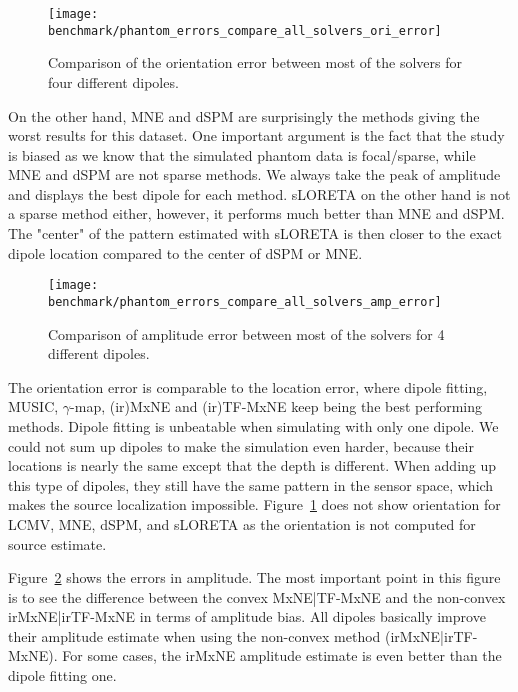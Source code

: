 \begin{figure}[h!]
	\centering 
    \texttt{[image: benchmark/phantom\_errors\_compare\_all\_solvers\_ori\_error]}
    \caption{Comparison of the orientation error between most of the solvers for four different dipoles. \label{fig:all_solvers_ori_error}}
\end{figure}

On the other hand, MNE and dSPM are surprisingly the methods giving the worst results for this dataset. One important argument is the fact that the study is biased as we know that the simulated phantom data is focal/sparse, while MNE and dSPM are not sparse methods. We always take the peak of amplitude and displays the best dipole for each method. sLORETA on the other hand is not a sparse method either, however, it performs much better than MNE and dSPM. The "center" of the pattern estimated with sLORETA is then closer to the exact dipole location compared to the center of dSPM or MNE.

\begin{figure}[h!]
	\texttt{[image: benchmark/phantom\_errors\_compare\_all\_solvers\_amp\_error]}
	\caption{Comparison of amplitude error between most of the solvers for 4 different dipoles.\label{fig:all_solvers_amp_error}}
\end{figure}

The orientation error is comparable to the location error, where dipole fitting, MUSIC, $\gamma$-map, (ir)MxNE and (ir)TF-MxNE keep being the best performing methods. Dipole fitting is unbeatable when simulating with only one dipole. We could not sum up dipoles to make the simulation even harder, because their locations is nearly the same except that the depth is different. When adding up this type of dipoles, they still have the same pattern in the sensor space, which makes the source localization impossible. Figure~\ref{fig:all_solvers_ori_error} does not show orientation for LCMV, MNE, dSPM, and sLORETA as the orientation is not computed for source estimate.

Figure~\ref{fig:all_solvers_amp_error} shows the errors in amplitude. The most important point in this figure is to see the difference between the convex MxNE|TF-MxNE and the non-convex irMxNE|irTF-MxNE in terms of amplitude bias. All dipoles basically improve their amplitude estimate when using the non-convex method (irMxNE|irTF-MxNE). For some cases, the irMxNE amplitude estimate is even better than the dipole fitting one.


